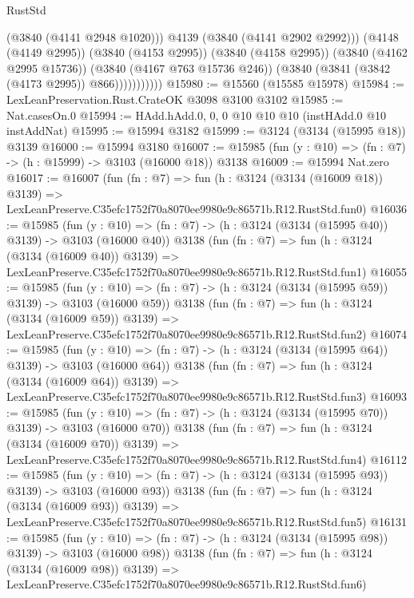 \begin{lexlean}{RustStd}
\begin{coremodule}
                          (@3840 (@4141 @2948 @1020)))
                        @4139
                        (@3840 (@4141 @2902 @2992)))
                      (@4148 (@4149 @2995))
                      (@3840 (@4153 @2995))
                      (@3840 (@4158 @2995))
                      (@3840 (@4162 @2995 @15736))
                      (@3840 (@4167 @763 @15736 @246))
                      (@3840 (@3841 (@3842 (@4173 @2995)) @866)))))))))))
@15980 := @15560 (@15585 @15978)
@15984 := LexLeanPreservation.Rust.CrateOK @3098 @3100 @3102
@15985 := Nat.casesOn.{0}
@15994 := HAdd.hAdd.{0, 0, 0} @10 @10 @10 (instHAdd.{0} @10 instAddNat)
@15995 := @15994 @3182
@15999 := @3124 (@3134 (@15995 @18)) @3139
@16000 := @15994 @3180
@16007 := @15985 (fun (y : @10) => (fn : @7) -> (h : @15999) -> @3103 (@16000 @18)) @3138
@16009 := @15994 Nat.zero
@16017 := @16007
    (fun (fn : @7) =>
    fun (h : @3124 (@3134 (@16009 @18)) @3139) =>
    LexLeanPreserve.C35efc1752f70a8070ee9980e9c86571b.R12.RustStd.fun0)
@16036 := @15985
    (fun (y : @10) => (fn : @7) -> (h : @3124 (@3134 (@15995 @40)) @3139) -> @3103 (@16000 @40))
    @3138
    (fun (fn : @7) =>
    fun (h : @3124 (@3134 (@16009 @40)) @3139) =>
    LexLeanPreserve.C35efc1752f70a8070ee9980e9c86571b.R12.RustStd.fun1)
@16055 := @15985
    (fun (y : @10) => (fn : @7) -> (h : @3124 (@3134 (@15995 @59)) @3139) -> @3103 (@16000 @59))
    @3138
    (fun (fn : @7) =>
    fun (h : @3124 (@3134 (@16009 @59)) @3139) =>
    LexLeanPreserve.C35efc1752f70a8070ee9980e9c86571b.R12.RustStd.fun2)
@16074 := @15985
    (fun (y : @10) => (fn : @7) -> (h : @3124 (@3134 (@15995 @64)) @3139) -> @3103 (@16000 @64))
    @3138
    (fun (fn : @7) =>
    fun (h : @3124 (@3134 (@16009 @64)) @3139) =>
    LexLeanPreserve.C35efc1752f70a8070ee9980e9c86571b.R12.RustStd.fun3)
@16093 := @15985
    (fun (y : @10) => (fn : @7) -> (h : @3124 (@3134 (@15995 @70)) @3139) -> @3103 (@16000 @70))
    @3138
    (fun (fn : @7) =>
    fun (h : @3124 (@3134 (@16009 @70)) @3139) =>
    LexLeanPreserve.C35efc1752f70a8070ee9980e9c86571b.R12.RustStd.fun4)
@16112 := @15985
    (fun (y : @10) => (fn : @7) -> (h : @3124 (@3134 (@15995 @93)) @3139) -> @3103 (@16000 @93))
    @3138
    (fun (fn : @7) =>
    fun (h : @3124 (@3134 (@16009 @93)) @3139) =>
    LexLeanPreserve.C35efc1752f70a8070ee9980e9c86571b.R12.RustStd.fun5)
@16131 := @15985
    (fun (y : @10) => (fn : @7) -> (h : @3124 (@3134 (@15995 @98)) @3139) -> @3103 (@16000 @98))
    @3138
    (fun (fn : @7) =>
    fun (h : @3124 (@3134 (@16009 @98)) @3139) =>
    LexLeanPreserve.C35efc1752f70a8070ee9980e9c86571b.R12.RustStd.fun6)

\end{coremodule}
\end{lexlean}
